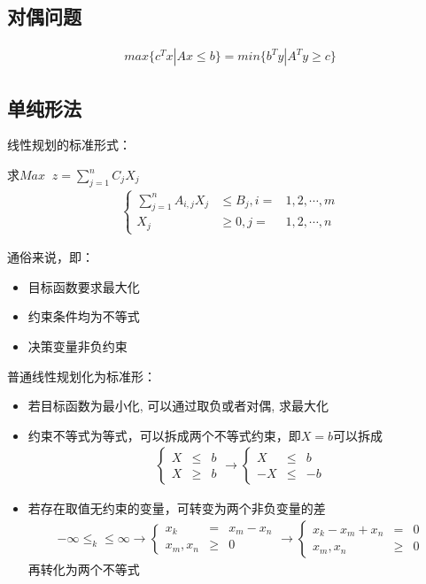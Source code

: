 \subsection{对偶问题}
\begin{eqnarray*}
max\{c^Tx|Ax\le b\}=min\{b^Ty|A^Ty\ge c\}
\end{eqnarray*}

\subsection{单纯形法}

线性规划的标准形式：\par
求$\displaystyle Max\;\;z = \sum\limits_{j = 1}^n C_jX_j$
\begin{eqnarray*}
\left\{
\begin{array}{cccc}
\sum\limits_{j = 1}^nA_{i, j}X_j &\leq B_j, i =& 1, 2, \cdots, m \\
X_j &\geq 0, j =& 1, 2, \cdots, n
\end{array}
\right.
\end{eqnarray*}

通俗来说，即：
\begin{itemize}
\item 目标函数要求最大化
\item 约束条件均为不等式
\item 决策变量非负约束
\end{itemize}

普通线性规划化为标准形：
\begin{itemize}
\item 若目标函数为最小化, 可以通过取负或者对偶, 求最大化
\item 约束不等式为等式，可以拆成两个不等式约束，即$\displaystyle X = b$可以拆成
\begin{eqnarray*}
\left\{
\begin{array}{cccc}
X &\leq& b \\
X &\geq& b
\end{array}
\right.
\rightarrow
\left\{
\begin{array}{cccc}
X &\leq& b \\
-X &\leq& -b
\end{array}
\right.
\end{eqnarray*}
\item 若存在取值无约束的变量，可转变为两个非负变量的差
\begin{eqnarray*}
-\infty \leq _k \leq \infty \rightarrow
\left\{
\begin{array}{cccc}
x_k &=& x_m - x_n \\
x_m, x_n &\geq& 0
\end{array}
\right.
\rightarrow
\left\{
\begin{array}{cccc}
x_k - x_m + x_n &=& 0 \\
x_m, x_n &\geq& 0
\end{array}
\right.
\end{eqnarray*}
再转化为两个不等式\par
\end{itemize}






